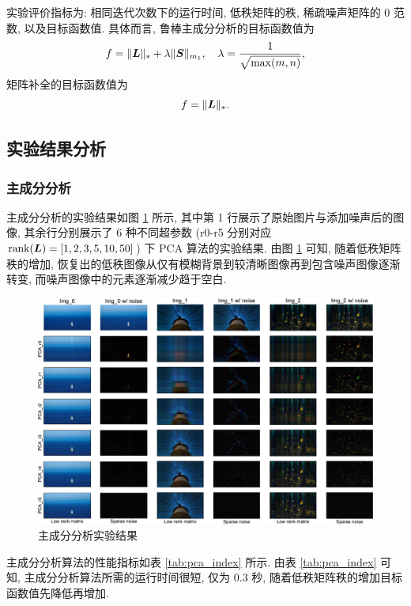 \documentclass[12pt]{article}
\begin{document}
实验评价指标为: 相同迭代次数下的运行时间, 低秩矩阵的秩, 稀疏噪声矩阵的 0 范数, 以及目标函数值. 具体而言, 鲁棒主成分分析的目标函数值为
\begin{equation}
  f=\|\bm{L}\|_{*}+\lambda\|\bm{S}\|_{m_1},\quad \lambda=\frac{1}{\sqrt{\max(m,n)}},
\end{equation}
矩阵补全的目标函数值为
\begin{equation}
  f=\|\bm{L}\|_{*}.
\end{equation}

\subsection{实验结果分析}

\subsubsection{主成分分析}

主成分分析的实验结果如图 \ref{fig:results_pca}  所示, 其中第 1 行展示了原始图片与添加噪声后的图像, 其余行分别展示了 6 种不同超参数 (\textsf{r0}-\textsf{r5} 分别对应 $\operatorname{rank}(\bm{L})=[1,2,3,5,10,50]$) 下 PCA 算法的实验结果. 由图 \ref{fig:results_pca} 可知, 随着低秩矩阵秩的增加, 恢复出的低秩图像从仅有模糊背景到较清晰图像再到包含噪声图像逐渐转变, 而噪声图像中的元素逐渐减少趋于空白.

\begin{figure}[!htbp]
  \centering
  \includegraphics[width=17cm]{pca_total.pdf}
  \caption{主成分分析实验结果}
  \label{fig:results_pca}
\end{figure}

主成分分析算法的性能指标如表 \ref{tab:pca_index} 所示. 由表 \ref{tab:pca_index} 可知, 主成分分析算法所需的运行时间很短, 仅为 0.3 秒, 随着低秩矩阵秩的增加目标函数值先降低再增加.
\end{document}
